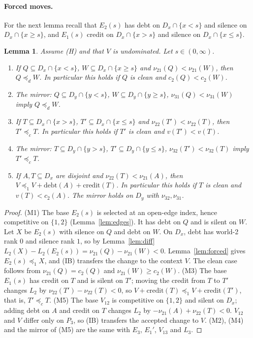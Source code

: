 \documentclass[11pt]{article}
\newtheorem{lemma}[theorem]{Lemma}
\theoremstyle{definition}\newtheorem{definition}[theorem]{Definition}
\theoremstyle{remark}\newtheorem{remark}[theorem]{Remark}
\newcommand{\debt}{\mathrm{debt}}
\newcommand{\cred}{\mathrm{credit}}
\begin{document}
\paragraph{Forced moves.} For the next lemma recall that $E_2(s)$ has debt on
$D_x\cap\{x<s\}$ and silence on $D_x\cap\{x\ge s\}$, and $E_1(s)$ credit on
$D_x\cap\{x>s\}$ and silence on $D_x\cap\{x\le s\}$.

\begin{lemma}\label{lem:moves}
Assume (H) and that $V$ is undominated. Let $s\in(0,\infty)$.
\begin{enumerate}[label=(M\arabic*),leftmargin=*,itemsep=1pt]
\item If $Q\subseteq D_x\cap\{x<s\}$, $W\subseteq D_x\cap\{x\ge s\}$ and
$\nu_{21}(Q)<\nu_{21}(W)$, then $Q\preceq_dW$. In particular this holds if
$Q$ is clean and $c_2(Q)<c_2(W)$.
\item The mirror: $Q\subseteq D_y\cap\{y<s\}$, $W\subseteq D_y\cap\{y\ge s\}$,
$\nu_{31}(Q)<\nu_{31}(W)$ imply $Q\preceq_dW$.
\item If $T\subseteq D_x\cap\{x>s\}$, $T'\subseteq D_x\cap\{x\le s\}$ and
$\nu_{22}(T')<\nu_{22}(T)$, then $T'\preceq_cT$. In particular this holds if
$T'$ is clean and $v(T')<v(T)$.
\item The mirror: $T\subseteq D_y\cap\{y>s\}$, $T'\subseteq D_y\cap\{y\le
s\}$, $\nu_{32}(T')<\nu_{32}(T)$ imply $T'\preceq_cT$.
\item If $A,T\subseteq D_x$ are disjoint and $\nu_{22}(T)<\nu_{21}(A)$, then
$V\preceq_1V+\debt(A)+\cred(T)$. In particular this holds if $T$ is clean
and $v(T)<c_2(A)$. The mirror holds on $D_y$ with $\nu_{32},\nu_{31}$.
\end{enumerate}
\end{lemma}
\begin{proof}
(M1) The base $E_2(s)$ is selected at an open-edge index, hence competitive
on $\{1,2\}$ (Lemma~\ref{lem:edges}). It has debt on $Q$ and is silent on $W$.
Let $X$ be $E_2(s)$ with silence on $Q$ and debt on $W$. On $D_x$, debt has
world-2 rank $0$ and silence rank $1$, so by Lemma~\ref{lem:diff}
$L_2(X)-L_2(E_2(s))=\nu_{21}(Q)-\nu_{21}(W)<0$. Lemma~\ref{lem:forced} gives
$E_2(s)\preceq_1X$, and (IB) transfers the change to the context $V$. The
clean case follows from $\nu_{21}(Q)=c_2(Q)$ and $\nu_{21}(W)\ge c_2(W)$.
(M3) The base $E_1(s)$ has credit on $T$ and is silent on $T'$; moving the
credit from $T$ to $T'$ changes $L_2$ by $\nu_{22}(T')-\nu_{22}(T)<0$, so
$V+\cred(T)\preceq_1V+\cred(T')$, that is, $T'\preceq_cT$. (M5) The base
$V_{12}$ is competitive on $\{1,2\}$ and silent on $D_x$; adding debt on $A$
and credit on $T$ changes $L_2$ by $-\nu_{21}(A)+\nu_{22}(T)<0$. $V_{12}$ and
$V$ differ only on $P_3$, so (IB) transfers the accepted change to $V$. (M2),
(M4) and the mirror of (M5) are the same with $E_3$, $E_1'$, $V_{13}$ and
$L_3$.
\end{proof}
\end{document}
